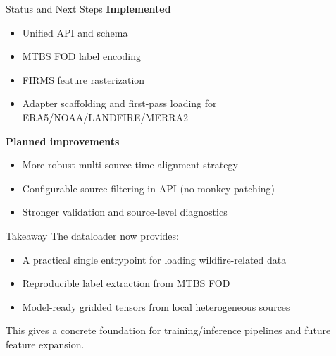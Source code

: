 \documentclass{beamer}
\begin{document}
\begin{frame}{Status and Next Steps}
\textbf{Implemented}
\begin{itemize}
  \item Unified API and schema
  \item MTBS FOD label encoding
  \item FIRMS feature rasterization
  \item Adapter scaffolding and first-pass loading for ERA5/NOAA/LANDFIRE/MERRA2
\end{itemize}
\textbf{Planned improvements}
\begin{itemize}
  \item More robust multi-source time alignment strategy
  \item Configurable source filtering in API (no monkey patching)
  \item Stronger validation and source-level diagnostics
\end{itemize}
\end{frame}

\begin{frame}{Takeaway}
The dataloader now provides:
\begin{itemize}
  \item A practical single entrypoint for loading wildfire-related data
  \item Reproducible label extraction from MTBS FOD
  \item Model-ready gridded tensors from local heterogeneous sources
\end{itemize}
\vspace{0.5em}
This gives a concrete foundation for training/inference pipelines and future
feature expansion.
\end{frame}
\end{document}
